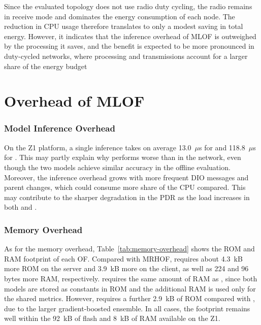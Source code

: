 Since the evaluated topology does not use radio duty cycling, the
radio remains in receive mode and dominates the energy consumption of
each node. The reduction in CPU usage therefore translates to only a
modest saving in total energy. However, it indicates that the
inference overhead of MLOF is outweighed by the processing it saves,
and the benefit is expected to be more pronounced in duty-cycled
networks, where processing and transmissions account for a larger
share of the energy budget

\section{Overhead of MLOF}\label{sec:overhead}
\subsubsection{Model Inference Overhead}
On the Z1 platform, a single inference takes on average 13.0~$\mu$s
for \dtree{} and 118.8~$\mu$s for \lgbm{}. This may partly explain
why \lgbm{} performs worse than
\dtree{} in the network, even though the two models achieve similar
accuracy in the offline evaluation. Moreover, the inference overhead
grows with more frequent DIO messages and parent changes, which could
consume more share of the CPU compared. This may contribute to the
sharper degradation in the PDR as the load increases in both \dtree{}
and \lgbm{}.

\subsubsection{Memory Overhead}
As for the memory overhead, Table~\ref{tab:memory-overhead} shows the
ROM and RAM footprint of each OF. Compared with MRHOF, \dtree{}
requires about 4.3~kB more ROM on the server and 3.9~kB more on the
client, as well as 224 and 96 bytes more RAM, respectively. \lgbm{}
requires the same amount of RAM as \dtree{}, since both models are
stored as constants in ROM and the additional RAM is used only for the
shared metrics. However, \lgbm{} requires a further 2.9~kB of ROM
compared with \dtree{}, due to the larger gradient-boosted ensemble.
In all cases, the footprint remains well within the 92~kB of flash and
8~kB of RAM available on the Z1.

